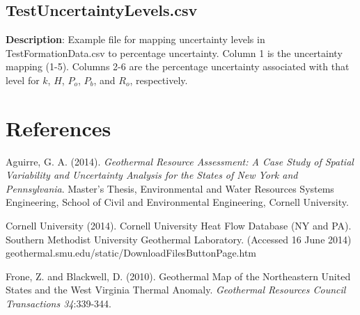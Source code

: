 \documentclass[12pt,a4paper]{article}
\begin{document}
\subsection*{\textsf{TestUncertaintyLevels.csv}}

\textbf{Description}: Example file for mapping uncertainty levels in \textsf{TestFormationData.csv} to percentage uncertainty. Column 1 is the uncertainty mapping (1-5). Columns 2-6 are the percentage uncertainty associated with that level for $k$, $H$, $P_o$, $P_b$, and $R_o$, respectively.

\newpage

\section*{References}

Aguirre, G. A. (2014). \textit{Geothermal Resource Assessment: A Case Study of Spatial Variability and Uncertainty Analysis for the States of New York and Pennsylvania}. Master's Thesis, Environmental and Water Resources Systems Engineering, School of Civil and Environmental Engineering, Cornell University.\hfill
\bigskip

\noindent
Cornell University (2014). Cornell University Heat Flow Database (NY and PA). Southern Methodist University Geothermal Laboratory. (Accessed 16 June 2014) geothermal.smu.edu/static/DownloadFilesButtonPage.htm \hfill
\bigskip

\noindent
Frone, Z. and Blackwell, D. (2010). Geothermal Map of the Northeastern United States and the West Virginia Thermal Anomaly. \textit{Geothermal Resources Council Transactions 34}:339-344.
\end{document}
